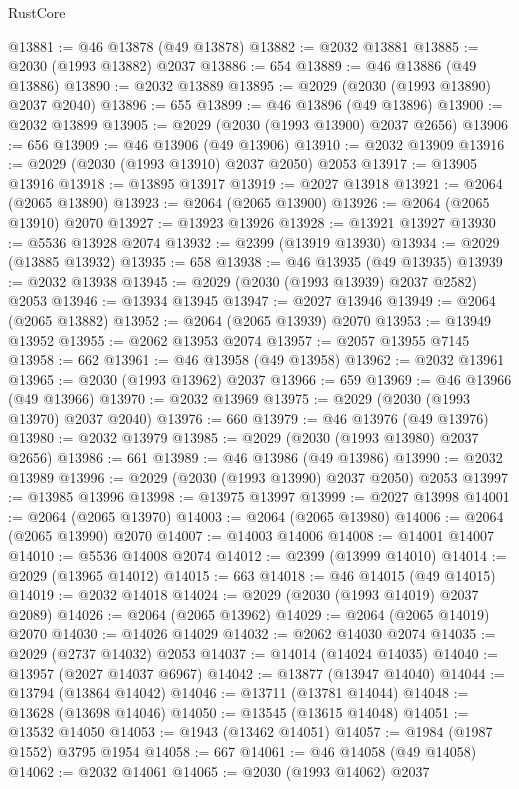 \begin{lexlean}{RustCore}
\begin{coremodule}
@13881 := @46 @13878 (@49 @13878)
@13882 := @2032 @13881
@13885 := @2030 (@1993 @13882) @2037
@13886 := 654
@13889 := @46 @13886 (@49 @13886)
@13890 := @2032 @13889
@13895 := @2029 (@2030 (@1993 @13890) @2037 @2040)
@13896 := 655
@13899 := @46 @13896 (@49 @13896)
@13900 := @2032 @13899
@13905 := @2029 (@2030 (@1993 @13900) @2037 @2656)
@13906 := 656
@13909 := @46 @13906 (@49 @13906)
@13910 := @2032 @13909
@13916 := @2029 (@2030 (@1993 @13910) @2037 @2050) @2053
@13917 := @13905 @13916
@13918 := @13895 @13917
@13919 := @2027 @13918
@13921 := @2064 (@2065 @13890)
@13923 := @2064 (@2065 @13900)
@13926 := @2064 (@2065 @13910) @2070
@13927 := @13923 @13926
@13928 := @13921 @13927
@13930 := @5536 @13928 @2074
@13932 := @2399 (@13919 @13930)
@13934 := @2029 (@13885 @13932)
@13935 := 658
@13938 := @46 @13935 (@49 @13935)
@13939 := @2032 @13938
@13945 := @2029 (@2030 (@1993 @13939) @2037 @2582) @2053
@13946 := @13934 @13945
@13947 := @2027 @13946
@13949 := @2064 (@2065 @13882)
@13952 := @2064 (@2065 @13939) @2070
@13953 := @13949 @13952
@13955 := @2062 @13953 @2074
@13957 := @2057 @13955 @7145
@13958 := 662
@13961 := @46 @13958 (@49 @13958)
@13962 := @2032 @13961
@13965 := @2030 (@1993 @13962) @2037
@13966 := 659
@13969 := @46 @13966 (@49 @13966)
@13970 := @2032 @13969
@13975 := @2029 (@2030 (@1993 @13970) @2037 @2040)
@13976 := 660
@13979 := @46 @13976 (@49 @13976)
@13980 := @2032 @13979
@13985 := @2029 (@2030 (@1993 @13980) @2037 @2656)
@13986 := 661
@13989 := @46 @13986 (@49 @13986)
@13990 := @2032 @13989
@13996 := @2029 (@2030 (@1993 @13990) @2037 @2050) @2053
@13997 := @13985 @13996
@13998 := @13975 @13997
@13999 := @2027 @13998
@14001 := @2064 (@2065 @13970)
@14003 := @2064 (@2065 @13980)
@14006 := @2064 (@2065 @13990) @2070
@14007 := @14003 @14006
@14008 := @14001 @14007
@14010 := @5536 @14008 @2074
@14012 := @2399 (@13999 @14010)
@14014 := @2029 (@13965 @14012)
@14015 := 663
@14018 := @46 @14015 (@49 @14015)
@14019 := @2032 @14018
@14024 := @2029 (@2030 (@1993 @14019) @2037 @2089)
@14026 := @2064 (@2065 @13962)
@14029 := @2064 (@2065 @14019) @2070
@14030 := @14026 @14029
@14032 := @2062 @14030 @2074
@14035 := @2029 (@2737 @14032) @2053
@14037 := @14014 (@14024 @14035)
@14040 := @13957 (@2027 @14037 @6967)
@14042 := @13877 (@13947 @14040)
@14044 := @13794 (@13864 @14042)
@14046 := @13711 (@13781 @14044)
@14048 := @13628 (@13698 @14046)
@14050 := @13545 (@13615 @14048)
@14051 := @13532 @14050
@14053 := @1943 (@13462 @14051)
@14057 := @1984 (@1987 @1552) @3795 @1954
@14058 := 667
@14061 := @46 @14058 (@49 @14058)
@14062 := @2032 @14061
@14065 := @2030 (@1993 @14062) @2037

\end{coremodule}
\end{lexlean}
